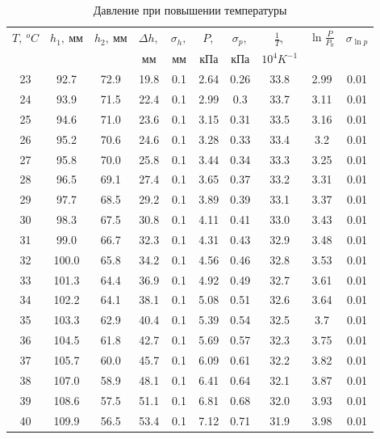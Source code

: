 \documentclass[12pt,a4paper]{article}
\begin{document}
\begin{enumerate}
    \newpage
    \begin{table}[htp]
        \centering
        \begin{tabular}[]{|c|c|c|c|c|c|c|c|c|c|}
            \hline
            $T,\ ^oC$ & $h_1,\ мм$ & $h_2,\ мм$ & $\Delta h,$ & $\sigma_h,$ & $P,$ & $\sigma_p,$ & $\frac 1 T,$& $\ln{\frac P {P_0}}$ & $\sigma_{\ln p}$\\
            & & & $мм$ & $мм$ & $кПа$ & $кПа$ & $10^4K^{-1}$ & & \\
            \hline
            23 & 92.7 & 72.9 & 19.8 & 0.1 & 2.64 & 0.26 & 33.8 & 2.99 & 0.01 \\
            \hline
            24 & 93.9 & 71.5 & 22.4 & 0.1 & 2.99 & 0.3 & 33.7 & 3.11 & 0.01 \\
            \hline
            25 & 94.6 & 71.0 & 23.6 & 0.1 & 3.15 & 0.31 & 33.5 & 3.16 & 0.01 \\
            \hline
            26 & 95.2 & 70.6 & 24.6 & 0.1 & 3.28 & 0.33 & 33.4 & 3.2 & 0.01 \\
            \hline
            27 & 95.8 & 70.0 & 25.8 & 0.1 & 3.44 & 0.34 & 33.3 & 3.25 & 0.01 \\
            \hline
            28 & 96.5 & 69.1 & 27.4 & 0.1 & 3.65 & 0.37 & 33.2 & 3.31 & 0.01 \\
            \hline
            29 & 97.7 & 68.5 & 29.2 & 0.1 & 3.89 & 0.39 & 33.1 & 3.37 & 0.01 \\
            \hline
            30 & 98.3 & 67.5 & 30.8 & 0.1 & 4.11 & 0.41 & 33.0 & 3.43 & 0.01 \\
            \hline
            31 & 99.0 & 66.7 & 32.3 & 0.1 & 4.31 & 0.43 & 32.9 & 3.48 & 0.01 \\
            \hline
            32 & 100.0 & 65.8 & 34.2 & 0.1 & 4.56 & 0.46 & 32.8 & 3.53 & 0.01 \\
            \hline
            33 & 101.3 & 64.4 & 36.9 & 0.1 & 4.92 & 0.49 & 32.7 & 3.61 & 0.01 \\
            \hline
            34 & 102.2 & 64.1 & 38.1 & 0.1 & 5.08 & 0.51 & 32.6 & 3.64 & 0.01 \\
            \hline
            35 & 103.3 & 62.9 & 40.4 & 0.1 & 5.39 & 0.54 & 32.5 & 3.7 & 0.01 \\
            \hline
            36 & 104.5 & 61.8 & 42.7 & 0.1 & 5.69 & 0.57 & 32.3 & 3.75 & 0.01 \\
            \hline
            37 & 105.7 & 60.0 & 45.7 & 0.1 & 6.09 & 0.61 & 32.2 & 3.82 & 0.01 \\
            \hline
            38 & 107.0 & 58.9 & 48.1 & 0.1 & 6.41 & 0.64 & 32.1 & 3.87 & 0.01 \\
            \hline
            39 & 108.6 & 57.5 & 51.1 & 0.1 & 6.81 & 0.68 & 32.0 & 3.93 & 0.01 \\
            \hline
            40 & 109.9 & 56.5 & 53.4 & 0.1 & 7.12 & 0.71 & 31.9 & 3.98 & 0.01 \\
            \hline
        \end{tabular}
        \caption{Давление при повышении температуры}
    \end{table}


\end{enumerate}
\end{document}
